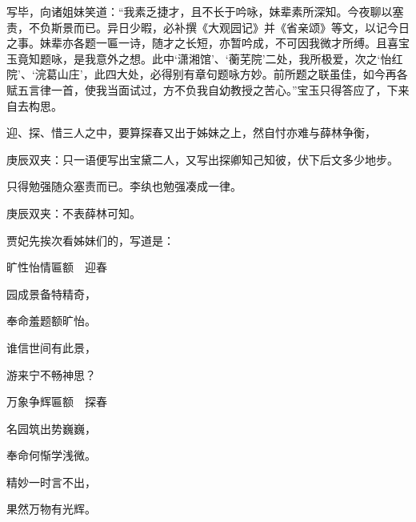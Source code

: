\begin{parag}
    写毕，向诸姐妹笑道：“我素乏捷才，且不长于吟咏，妹辈素所深知。今夜聊以塞责，不负斯景而已。异日少暇，必补撰《大观园记》并《省亲颂》等文，以记今日之事。妹辈亦各题一匾一诗，随才之长短，亦暂吟成，不可因我微才所缚。且喜宝玉竟知题咏，是我意外之想。此中‘潇湘馆’、‘蘅芜院’二处，我所极爱，次之‘怡红院’、‘浣葛山庄’，此四大处，必得别有章句题咏方妙。前所题之联虽佳，如今再各赋五言律一首，使我当面试过，方不负我自幼教授之苦心。”宝玉只得答应了，下来自去构思。
\end{parag}


\begin{parag}
    迎、探、惜三人之中，要算探春又出于姊妹之上，然自忖亦难与薛林争衡，\begin{note}庚辰双夹：只一语便写出宝黛二人，又写出探卿知己知彼，伏下后文多少地步。\end{note}只得勉强随众塞责而已。李纨也勉强凑成一律。\begin{note}庚辰双夹：不表薛林可知。\end{note}贾妃先挨次看姊妹们的，写道是：
\end{parag}


\begin{poem}
    \begin{pl}旷性怡情匾额　迎春\end{pl}

    \begin{pl}园成景备特精奇，\end{pl}

    \begin{pl}奉命羞题额旷怡。\end{pl}

    \begin{pl}谁信世间有此景，\end{pl}

    \begin{pl}游来宁不畅神思？\end{pl}
\end{poem}


\begin{poem}
    \begin{pl}万象争辉匾额　探春\end{pl}

    \begin{pl}名园筑出势巍巍，\end{pl}

    \begin{pl}奉命何惭学浅微。\end{pl}

    \begin{pl}精妙一时言不出，\end{pl}

    \begin{pl}果然万物有光辉。\end{pl}
\end{poem}


